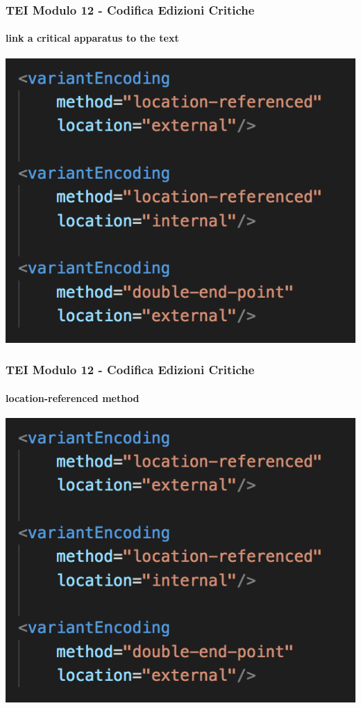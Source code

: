 \begin{frame}
    \frametitle{TEI Modulo 12 - Codifica Edizioni Critiche}
    \framesubtitle{link a critical apparatus to the text}
    \addtocounter{nframe}{1}
    

    \begin{center}
       \includegraphics[width=.95\textwidth]{imgs/variantEncoding.png}
    \end{center}

\end{frame}



\begin{frame}
    \frametitle{TEI Modulo 12 - Codifica Edizioni Critiche}
    \framesubtitle{location-referenced method}
    \addtocounter{nframe}{1}
    

    \begin{center}
       \includegraphics[width=.95\textwidth]{imgs/variantEncoding.png}
    \end{center}

\end{frame}




